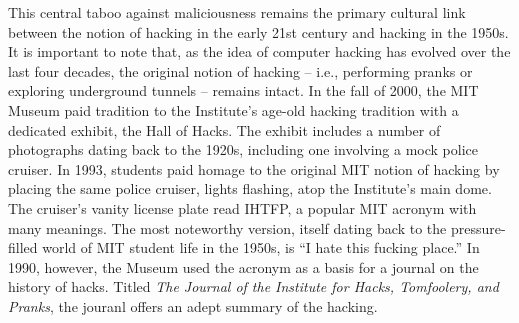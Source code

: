 


\ifdefined\eng
This central taboo against maliciousness remains the primary cultural link between the notion of hacking in the early 21st century and hacking in the 1950s.%
It is important to note that, as the idea of computer hacking has evolved over the last four decades, the original notion of hacking -- i.e., performing pranks or exploring underground tunnels -- remains intact. In the fall of 2000, the MIT Museum paid tradition to the Institute's age-old hacking tradition with a dedicated exhibit, the Hall of Hacks. The exhibit includes a number of photographs dating back to the 1920s, including one involving a mock police cruiser. In 1993, students paid homage to the original MIT notion of hacking by placing the same police cruiser, lights flashing, atop the Institute's main dome. The cruiser's vanity license plate read IHTFP, a popular MIT acronym with many meanings. The most noteworthy version, itself dating back to the pressure-filled world of MIT student life in the 1950s, is ``I hate this fucking place.'' In 1990, however, the Museum used the acronym as a basis for a journal on the history of hacks. Titled \textit{The Journal of the Institute for Hacks, Tomfoolery, and Pranks}, the jouranl offers an adept summary of the hacking.
\fi

